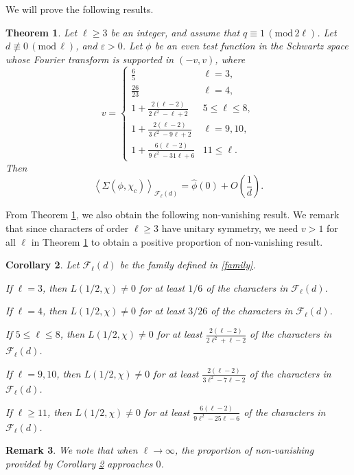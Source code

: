 \documentclass[12pt]{amsart}
\newtheorem{theorem}{Theorem}[section]
\newtheorem{corollary}[theorem]{Corollary}
\newtheorem{remark}[theorem]{Remark}
\renewcommand{\pmod}[1]{\,(\mathrm{mod}\,#1)}
\begin{document}
We will prove the following results.
\begin{theorem}
\label{main_thm}
Let $\ell \geq 3$ be an integer, and assume that $q \equiv 1 \pmod{2\ell}$. Let $d \not \equiv 0 \pmod{\ell}$, and $\varepsilon>0$. Let $\phi$ be an even test function in the Schwartz space whose Fourier transform is supported in $(-v,v)$, where
\[v=\begin{cases}\frac{6}{5} & \ell=3,\\
\frac{26}{23} & \ell=4,\\
1+\frac{2(\ell-2)}{2\ell^2-\ell+2} & 5\leq \ell \leq 8,\\
1+\frac{2(\ell-2)}{3\ell^2-9\ell+2} & \ell=9, 10,\\
1 + \frac{6 (\ell - 2)}{9 \ell^2 - 31 \ell + 6} & 11\leq  \ell.\end{cases}
\]
Then
\begin{equation*}
\left\langle\Sigma(\phi,\chi_c)\right\rangle_{\mathcal{F}_\ell(d)}  = \widehat{\phi}(0) +O \left(\frac{1}{d}\right) .
\end{equation*}
\end{theorem}


From Theorem \ref{main_thm}, we also obtain the following non-vanishing result. We remark that since characters of order $\ell \geq 3$ have unitary symmetry, we need $v > 1$ for all $\ell$ in Theorem \ref{main_thm} to obtain a positive proportion of non-vanishing result.
\begin{corollary}
\label{cor_nonvanishing}
Let $\mathcal{F}_{\ell}(d)$ be the family defined in \eqref{family}.


If $\ell=3$, then $L(1/2,\chi) \neq 0$ for at least $1/6$ of the characters in $\mathcal{F}_{\ell}(d)$.

If $\ell=4$, then $L(1/2,\chi) \neq 0$ for at least $3/26$ of the characters in $\mathcal{F}_{\ell}(d)$.

If $5\leq \ell\leq 8$, then $L(1/2,\chi) \neq 0$ for at least $\frac{2(\ell-2)}{2\ell^2+\ell-2}$ of the characters in $\mathcal{F}_{\ell}(d)$.


If $\ell=9,10$, then $L(1/2,\chi) \neq 0$ for at least $\frac{2(\ell-2)}{3\ell^2-7\ell-2}$ of the characters in $\mathcal{F}_{\ell}(d)$.


If $\ell \geq 11$, then $L(1/2,\chi) \neq 0$ for at least $\frac{6(\ell-2)}{9\ell^2-25\ell-6}$ of the characters in $\mathcal{F}_{\ell}(d)$.


\end{corollary}
\begin{remark}
We note that when $\ell \to \infty$, the proportion of non-vanishing provided by Corollary \ref{cor_nonvanishing} approaches $0$.
\end{remark}
\end{document}
